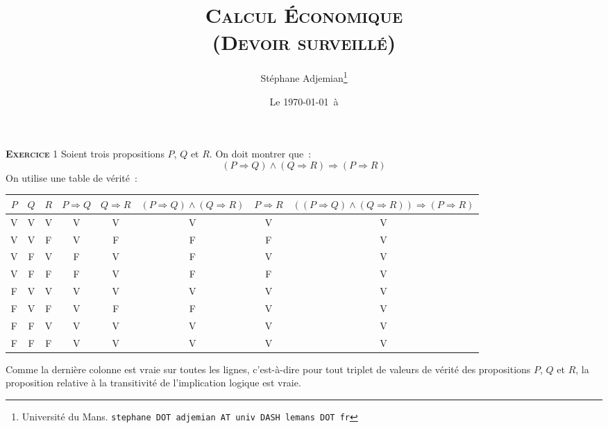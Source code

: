 \documentclass[10pt,a4paper,notitlepage]{article}
\newcommand{\exercice}[1]{\textsc{\textbf{Exercice}} #1}
\begin{document}
\title{\textsc{Calcul Économique\\ \small{(Devoir surveillé)}}}
\author{Stéphane Adjemian\thanks{Université du Mans. \texttt{stephane DOT adjemian AT univ DASH lemans DOT fr}}}
\date{Le \today\ à \thistime}

\maketitle


\exercice{1} Soient trois propositions $P$, $Q$ et $R$. On doit montrer que~:
\[
(P\Rightarrow Q) \land (Q\Rightarrow R) \Longrightarrow (P\Rightarrow R)
\]
On utilise une table de vérité~:


\begin{table}[H]
    \hspace*{-2cm}\begin{tabular}[H]{|ccc|ccccc|}
      \hline
      $P$ & $Q$ & $R$ & $P\Rightarrow Q$ & $Q\Rightarrow R$ & $(P\Rightarrow Q) \land (Q\Rightarrow R)$ & $P\Rightarrow R$ & $((P\Rightarrow Q) \land (Q\Rightarrow R))\Rightarrow (P\Rightarrow R)$\\ \hline
      V & V & V & V & V & V & V & V \\
      V & V & F & V & F & F & F & V \\
      V & F & V & F & V & F & V & V \\
      V & F & F & F & V & F & F & V \\
      F & V & V & V & V & V & V & V \\
      F & V & F & V & F & F & V & V \\
      F & F & V & V & V & V & V & V \\
      F & F & F & V & V & V & V & V \\
      \hline\hline
    \end{tabular}\hspace*{-2cm}
\end{table}
  
  Comme la dernière colonne est vraie sur toutes les lignes, c'est-à-dire pour
  tout triplet de valeurs de vérité des propositions $P$, $Q$ et $R$, la
  proposition relative à la transitivité de l'implication logique est vraie.

  \bigskip
  
\end{document}
